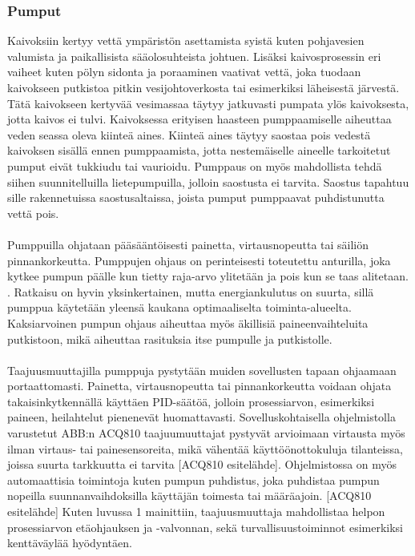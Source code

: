 \documentclass[finnish,12pt,a4paper,pdftex,elec,utf8]{aaltothesis}
\begin{document}
\subsubsection{Pumput}
Kaivoksiin kertyy vettä ympäristön asettamista syistä kuten pohjavesien valumista ja paikallisista sääolosuhteista johtuen. Lisäksi kaivosprosessin eri vaiheet kuten pölyn sidonta ja poraaminen vaativat vettä, joka tuodaan kaivokseen putkistoa pitkin vesijohtoverkosta tai esimerkiksi läheisestä järvestä. Tätä kaivokseen kertyvää vesimassaa täytyy jatkuvasti pumpata ylös kaivoksesta, jotta kaivos ei tulvi. Kaivoksessa erityisen haasteen pumppaamiselle aiheuttaa veden seassa oleva kiinteä aines. Kiinteä aines täytyy saostaa pois vedestä kaivoksen sisällä ennen pumppaamista, jotta nestemäiselle aineelle tarkoitetut pumput eivät tukkiudu tai vaurioidu. Pumppaus on myös mahdollista tehdä siihen suunnitelluilla lietepumpuilla, jolloin saostusta ei tarvita. Saostus tapahtuu sille rakennetuissa saostusaltaissa, joista pumput pumppaavat puhdistunutta vettä pois.
\\\\
Pumppuilla ohjataan pääsääntöisesti painetta, virtausnopeutta tai säiliön pinnankorkeutta. Pumppujen ohjaus on perinteisesti toteutettu anturilla, joka kytkee pumpun päälle kun tietty raja-arvo ylitetään ja pois kun se taas alitetaan. \cite{Hakapää}. Ratkaisu on hyvin yksinkertainen, mutta energiankulutus on suurta, sillä pumppua käytetään yleensä kaukana optimaaliselta toiminta-alueelta. Kaksiarvoinen pumpun ohjaus aiheuttaa myös äkillisiä paineenvaihteluita putkistoon, mikä aiheuttaa rasituksia itse pumpulle ja putkistolle.
\\\\
Taajuusmuuttajilla pumppuja pystytään muiden sovellusten tapaan ohjaamaan portaattomasti. Painetta, virtausnopeutta tai pinnankorkeutta voidaan ohjata takaisinkytkennällä käyttäen PID-säätöä, jolloin prosessiarvon, esimerkiksi paineen, heilahtelut pienenevät huomattavasti. Sovelluskohtaisella ohjelmistolla varustetut ABB:n ACQ810 taajuumuuttajat pystyvät arvioimaan virtausta myös ilman virtaus- tai painesensoreita, mikä vähentää käyttöönottokuluja tilanteissa, joissa suurta tarkkuutta ei tarvita [ACQ810 esitelähde]. Ohjelmistossa on myös automaattisia toimintoja kuten pumpun puhdistus, joka puhdistaa pumpun nopeilla suunnanvaihdoksilla käyttäjän toimesta tai määräajoin. [ACQ810 esitelähde] Kuten luvussa 1 mainittiin, taajuusmuuttaja mahdollistaa helpon prosessiarvon etäohjauksen ja -valvonnan, sekä turvallisuustoiminnot esimerkiksi kenttäväylää hyödyntäen.
\end{document}
